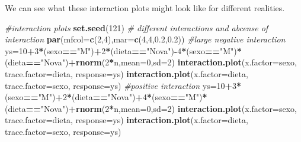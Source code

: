 \documentclass[
]{book}
\newenvironment{Shaded}{\begin{snugshade}}{\end{snugshade}}
\newcommand{\AttributeTok}[1]{\textcolor[rgb]{0.13,0.29,0.53}{#1}}
\newcommand{\CommentTok}[1]{\textcolor[rgb]{0.56,0.35,0.01}{\textit{#1}}}
\newcommand{\DecValTok}[1]{\textcolor[rgb]{0.00,0.00,0.81}{#1}}
\newcommand{\FloatTok}[1]{\textcolor[rgb]{0.00,0.00,0.81}{#1}}
\newcommand{\FunctionTok}[1]{\textcolor[rgb]{0.13,0.29,0.53}{\textbf{#1}}}
\newcommand{\NormalTok}[1]{#1}
\newcommand{\OtherTok}[1]{\textcolor[rgb]{0.56,0.35,0.01}{#1}}
\newcommand{\SpecialCharTok}[1]{\textcolor[rgb]{0.81,0.36,0.00}{\textbf{#1}}}
\newcommand{\StringTok}[1]{\textcolor[rgb]{0.31,0.60,0.02}{#1}}
\begin{document}
We can see what these interaction plots might look like for different realities.

\begin{Shaded}
\begin{Highlighting}[]
\CommentTok{\#interaction plots}
\FunctionTok{set.seed}\NormalTok{(}\DecValTok{121}\NormalTok{)}
\CommentTok{\# different interactions and abcense of interaction}
\FunctionTok{par}\NormalTok{(}\AttributeTok{mfcol=}\FunctionTok{c}\NormalTok{(}\DecValTok{2}\NormalTok{,}\DecValTok{4}\NormalTok{),}\AttributeTok{mar=}\FunctionTok{c}\NormalTok{(}\DecValTok{4}\NormalTok{,}\DecValTok{4}\NormalTok{,}\FloatTok{0.2}\NormalTok{,}\FloatTok{0.2}\NormalTok{))}
\CommentTok{\#large negative interaction}
\NormalTok{ys}\OtherTok{=}\DecValTok{10}\SpecialCharTok{+}\DecValTok{3}\SpecialCharTok{*}\NormalTok{(sexo}\SpecialCharTok{==}\StringTok{"M"}\NormalTok{)}\SpecialCharTok{+}\DecValTok{2}\SpecialCharTok{*}\NormalTok{(dieta}\SpecialCharTok{==}\StringTok{"Nova"}\NormalTok{)}\SpecialCharTok{{-}}\DecValTok{4}\SpecialCharTok{*}\NormalTok{(sexo}\SpecialCharTok{==}\StringTok{"M"}\NormalTok{)}\SpecialCharTok{*}\NormalTok{(dieta}\SpecialCharTok{==}\StringTok{"Nova"}\NormalTok{)}\SpecialCharTok{+}\FunctionTok{rnorm}\NormalTok{(}\DecValTok{2}\SpecialCharTok{*}\NormalTok{n,}\AttributeTok{mean=}\DecValTok{0}\NormalTok{,}\AttributeTok{sd=}\DecValTok{2}\NormalTok{)}
\FunctionTok{interaction.plot}\NormalTok{(}\AttributeTok{x.factor=}\NormalTok{sexo, }\AttributeTok{trace.factor=}\NormalTok{dieta, }\AttributeTok{response=}\NormalTok{ys)}
\FunctionTok{interaction.plot}\NormalTok{(}\AttributeTok{x.factor=}\NormalTok{dieta, }\AttributeTok{trace.factor=}\NormalTok{sexo, }\AttributeTok{response=}\NormalTok{ys)}
\CommentTok{\#positive interaction}
\NormalTok{ys}\OtherTok{=}\DecValTok{10}\SpecialCharTok{+}\DecValTok{3}\SpecialCharTok{*}\NormalTok{(sexo}\SpecialCharTok{==}\StringTok{"M"}\NormalTok{)}\SpecialCharTok{+}\DecValTok{2}\SpecialCharTok{*}\NormalTok{(dieta}\SpecialCharTok{==}\StringTok{"Nova"}\NormalTok{)}\SpecialCharTok{+}\DecValTok{4}\SpecialCharTok{*}\NormalTok{(sexo}\SpecialCharTok{==}\StringTok{"M"}\NormalTok{)}\SpecialCharTok{*}\NormalTok{(dieta}\SpecialCharTok{==}\StringTok{"Nova"}\NormalTok{)}\SpecialCharTok{+}\FunctionTok{rnorm}\NormalTok{(}\DecValTok{2}\SpecialCharTok{*}\NormalTok{n,}\AttributeTok{mean=}\DecValTok{0}\NormalTok{,}\AttributeTok{sd=}\DecValTok{2}\NormalTok{)}
\FunctionTok{interaction.plot}\NormalTok{(}\AttributeTok{x.factor=}\NormalTok{sexo, }\AttributeTok{trace.factor=}\NormalTok{dieta, }\AttributeTok{response=}\NormalTok{ys)}
\FunctionTok{interaction.plot}\NormalTok{(}\AttributeTok{x.factor=}\NormalTok{dieta, }\AttributeTok{trace.factor=}\NormalTok{sexo, }\AttributeTok{response=}\NormalTok{ys)}

\end{Highlighting}
\end{Shaded}
\end{document}
